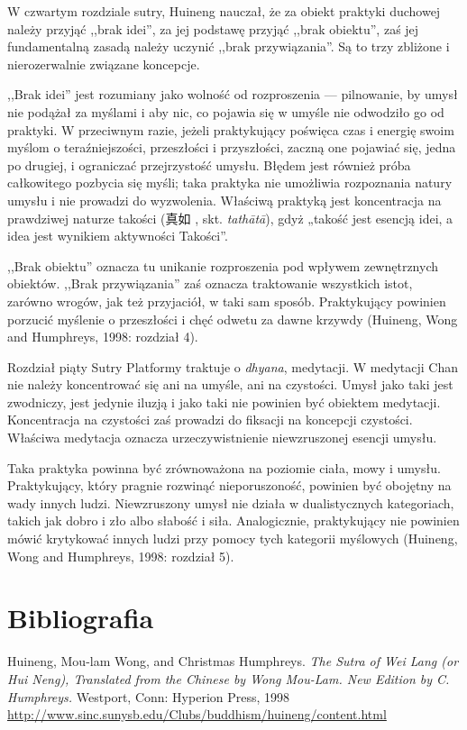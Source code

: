 W czwartym rozdziale sutry, Huineng nauczał, że za obiekt praktyki duchowej należy przyjąć ,,brak idei'', za jej podstawę przyjąć ,,brak obiektu'', zaś jej fundamentalną zasadą należy uczynić ,,brak przywiązania''. Są to trzy zbliżone i nierozerwalnie związane koncepcje.

,,Brak idei'' jest rozumiany jako wolność od rozproszenia --- pilnowanie, by umysł nie podążał za myślami i aby nic, co pojawia się w umyśle nie odwodziło go od praktyki. W przeciwnym razie, jeżeli praktykujący poświęca czas i energię swoim myślom o teraźniejszości, przeszłości i przyszłości, zaczną one pojawiać się, jedna po drugiej, i ograniczać przejrzystość umysłu. Błędem jest również próba całkowitego pozbycia się myśli; taka praktyka nie umożliwia rozpoznania natury umysłu i nie prowadzi do wyzwolenia. Właściwą praktyką jest koncentracja na prawdziwej naturze takości (真如 , skt. \emph{tathātā}), gdyż „takość jest esencją idei, a idea jest wynikiem aktywności Takości”.

,,Brak obiektu'' oznacza tu unikanie rozproszenia pod wpływem zewnętrznych obiektów. ,,Brak przywiązania'' zaś oznacza traktowanie wszystkich istot, zarówno wrogów, jak też przyjaciół, w taki sam sposób. Praktykujący powinien porzucić myślenie o przeszłości i chęć odwetu za dawne krzywdy (Huineng, Wong and Humphreys, 1998: rozdział 4).

Rozdział piąty Sutry Platformy traktuje o \emph{dhyana}, medytacji. W medytacji Chan nie należy koncentrować się ani na umyśle, ani na czystości. Umysł jako taki jest zwodniczy, jest jedynie iluzją i jako taki nie powinien być obiektem medytacji. Koncentracja na czystości zaś prowadzi do fiksacji na koncepcji czystości. Właściwa medytacja oznacza urzeczywistnienie niewzruszonej esencji umysłu.

Taka praktyka powinna być zrównoważona na poziomie ciała, mowy i umysłu. Praktykujący, który pragnie rozwinąć nieporuszoność, powinien być obojętny na wady innych ludzi. Niewzruszony umysł nie działa w dualistycznych kategoriach, takich jak dobro i zło albo słabość i siła. Analogicznie, praktykujący nie powinien mówić krytykować innych ludzi przy pomocy tych kategorii myślowych (Huineng, Wong and Humphreys, 1998: rozdział 5).

\section*{Bibliografia}

Huineng, Mou-lam Wong, and Christmas Humphreys. \emph{The Sutra of Wei Lang (or Hui Neng), Translated from the Chinese by Wong Mou-Lam. New Edition by C. Humphreys.} Westport, Conn: Hyperion Press, 1998 
\url{http://www.sinc.sunysb.edu/Clubs/buddhism/huineng/content.html}

